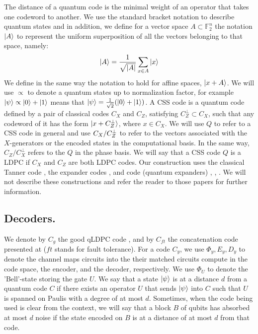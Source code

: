 \documentclass[manuscript,screen,review]{acmart}
\begin{document}
{The distance of a quantum code is the minimal weight of an operator that takes one codeword to another. We use the standard bracket notation to describe quantum states and in addition, we define for a vector space $A \subset \mathbb{F}_{2}^{n}$ the notation $\ket{A}$ to represent the uniform superposition of all the vectors belonging to that space, namely: \begin{equation*}
  \begin{split}
\ket{A} = \frac{1}{\sqrt{|A|}}\sum_{x \in A}{\ket{x}}
  \end{split}
\end{equation*}
We define in the same way the notation to hold for affine spaces, $\ket{x +A}$. We will use $\propto$ to denote a quantum states up to normalization factor, for example $\ket{\psi} \propto \ket{0} + \ket{1}$ means that $\ket{\psi} = \frac{1}{\sqrt{2}}(\ket{0} + \ket{1})$.
A CSS code is a quantum code defined by a pair of classical codes $C_{X}$ and $C_{Z}$, satisfying $C_{Z}^{\perp} \subset C_{X}$, such that any codeword of it has the form $\ket{x + C_{Z}^\perp}$, where $x \in C_{X}$. We will use $Q$ to refer to a CSS code in general and use $C_{X}/C_{Z}^\perp$ to refer to the vectors associated with the $X$-generators or the encoded states in the computational basis. In the same way, $C_{Z}/C_{X}^{\perp}$ refers to the $Q$ in the phase basis. We will say that a CSS code $Q$ is a LDPC if $C_{X}$ and $C_{Z}$ are both LDPC codes. Our construction uses the classical Tanner code \cite{Tanner}, the expander codes \cite{ExpanderCodes}, and \Hyp  code (quantum expanders) \cite{Leverrier_2015}, \cite{Tillich_2014}, \cite{overheadofquantumerrorcorrection}. We will not describe these constructions and refer the reader to those papers for further information.

\subsection{Decoders.} \label{sec:decoders} We denote by $C_{g}$ the good qLDPC code \cite{Dinur} \cite{Pavel} \cite{leverrier2022quantum}, and by $C_{ft}$ the concatenation code presented at \cite{aharonov1999faulttolerant} ($ft$ stands for fault tolerance). For a code $C_{y}$, we use $\Phi_{y}, E_{y}, D_{y}$ to denote the channel maps circuits into the their matched circuits compute in the code space, the encoder, and the decoder, respectively. We use $\Phi_{U}$ to denote the 'Bell'-state storing the gate $U$. We say that a state $\ket{\psi}$ is at a distance $d$ from a quantum code $C$ if there exists an operator $U$ that sends $\ket{\psi}$ into $C$ such that $U$ is spanned on Paulis with a degree of at most $d$. Sometimes, when the code being used is clear from the context, we will say that a block $B$ of qubits has absorbed at most $d$ noise if the state encoded on $B$ is at a distance of at most $d$ from that code.

}
\end{document}
